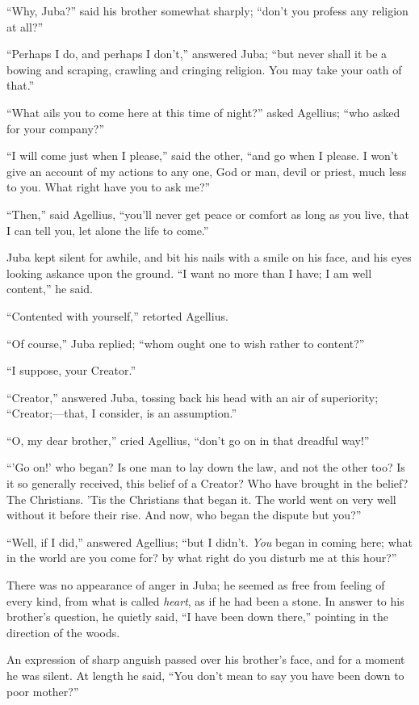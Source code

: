 ``Why, Juba?'' said his brother somewhat sharply; ``don't
you profess any religion at all?''

``Perhaps I do, and perhaps I don't,'' answered Juba;
``but never shall it be a bowing and scraping, crawling and
cringing religion. You may take your oath of that.''

``What ails you to come here at this time of night?'' asked
Agellius; ``who asked for your company?''

``I will come just when I please,'' said the other,
``and go when I please. I won't give an account of my actions
to any one, God or man, devil or priest, much less to you. What right
have you to ask me?''

``Then,'' said Agellius, ``you'll never get peace or
comfort as long as you live, that I can tell you, let alone the life
to come.''

Juba kept silent for awhile, and bit his nails with a smile on his
face, and his eyes looking askance upon the ground. ``I want no
more than I have; I am well content,'' he said.

``Contented with yourself,'' retorted Agellius.

``Of course,'' Juba replied; ``whom ought one to wish
rather to content?''

``I suppose, your Creator.''

``Creator,'' answered Juba, tossing back his head with an
air of superiority; ``Creator;—that, I consider, is an
assumption.''

``O, my dear brother,'' cried Agellius, ``don't go on
in that dreadful way!''

``'Go on!' who began? Is one man to lay down the law, and not
the other too? Is it so generally received, this belief of a Creator?
Who have brought in the belief? The Christians. 'Tis the Christians
that began it. The world went on very well without it before their
rise. And now, who began the dispute but you?''

``Well, if I did,'' answered Agellius; ``but I didn't. \emph{You}
began in coming here; what in the world are you come for? by what
right do you disturb me at this hour?''

There was no appearance of anger in Juba; he seemed as free from
feeling of every kind, from what is called \emph{heart}, as if he had
been a stone. In answer to his brother's question, he quietly said,
``I have been down there,'' pointing in the direction of the
woods.

An expression of sharp anguish passed over his brother's face, and
for a moment he was silent. At length he said, ``You don't mean to
say you have been down to poor mother?''

